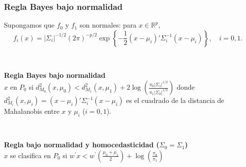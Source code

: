 \documentclass{beamer}
\begin{document}
\begin{frame}
\frametitle{Regla Bayes bajo normalidad}

Supongamos que $f_0$ y $f_1$ son normales: para $x\in\mathbb{R}^p$,
\[
f_i(x) = |\Sigma_i|^{-1/2}(2\pi)^{-p/2}\exp\left\{-\frac{1}{2}(x-\mu_i)'\Sigma_i^{-1}(x-\mu_i)    \right\},\quad i=0,1.
\]

\

\textbf{Regla Bayes bajo normalidad}\\
$x$ en $P_0$ si $\displaystyle  d_{M_0}^2(x,\mu_0)<d^2_{M_1}(x,\mu_1)+2\log\left(\frac{\pi_0|\Sigma_1|^{1/2}}{\pi_1|\Sigma_0|^{1/2}}\right)$
donde $\displaystyle d_{M_i}^2(x,\mu_i)=(x-\mu_i)'\Sigma_i^{-1}(x-\mu_i)$ es el cuadrado de la distancia de Mahalanobis entre $x$ y $\mu_i$ ($i=0,1$).
\medskip


\

\textbf{Regla bajo normalidad y homocedasticidad ($\Sigma_0=\Sigma_1$)}\\
$x$ se clasifica en $P_0$ si
$\displaystyle  w^\prime  x < w^\prime  \left(\frac{\mu_0+\mu_1}{2}\right)+  \log\left(\frac{\pi_0}{\pi_1}\right)$





\end{frame}

\end{document}
